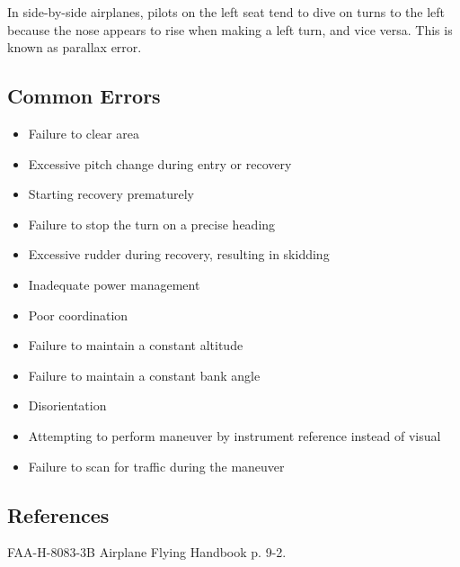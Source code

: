 In side-by-side airplanes, pilots on the left seat tend to dive on turns to the
left because the nose appears to rise when making a left turn, and vice versa.
This is known as parallax error.

\subsection{Common Errors}

\begin{itemize}
  \item Failure to clear area
  \item Excessive pitch change during entry or recovery
  \item Starting recovery prematurely
  \item Failure to stop the turn on a precise heading
  \item Excessive rudder during recovery, resulting in skidding
  \item Inadequate power management
  \item Poor coordination
  \item Failure to maintain a constant altitude
  \item Failure to maintain a constant bank angle
  \item Disorientation
  \item Attempting to perform maneuver by instrument reference instead of
    visual
  \item Failure to scan for traffic during the maneuver
\end{itemize}

\subsection{References}

FAA-H-8083-3B Airplane Flying Handbook p. 9-2.

